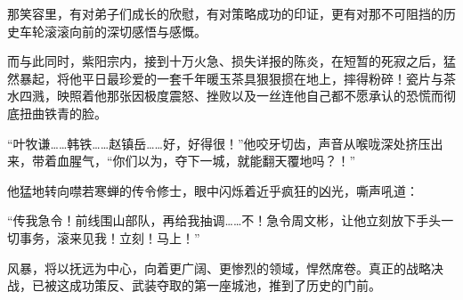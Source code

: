 那笑容里，有对弟子们成长的欣慰，有对策略成功的印证，更有对那不可阻挡的历史车轮滚滚向前的深切感悟与感慨。

而与此同时，紫阳宗内，接到十万火急、损失详报的陈炎，在短暂的死寂之后，猛然暴起，将他平日最珍爱的一套千年暖玉茶具狠狠掼在地上，摔得粉碎！瓷片与茶水四溅，映照着他那张因极度震怒、挫败以及一丝连他自己都不愿承认的恐慌而彻底扭曲铁青的脸。

“叶牧谦……韩铁……赵镇岳……好，好得很！”他咬牙切齿，声音从喉咙深处挤压出来，带着血腥气，“你们以为，夺下一城，就能翻天覆地吗？！”

他猛地转向噤若寒蝉的传令修士，眼中闪烁着近乎疯狂的凶光，嘶声吼道：

“传我急令！前线围山部队，再给我抽调……不！急令周文彬，让他立刻放下手头一切事务，滚来见我！立刻！马上！”

风暴，将以抚远为中心，向着更广阔、更惨烈的领域，悍然席卷。真正的战略决战，已被这成功策反、武装夺取的第一座城池，推到了历史的门前。